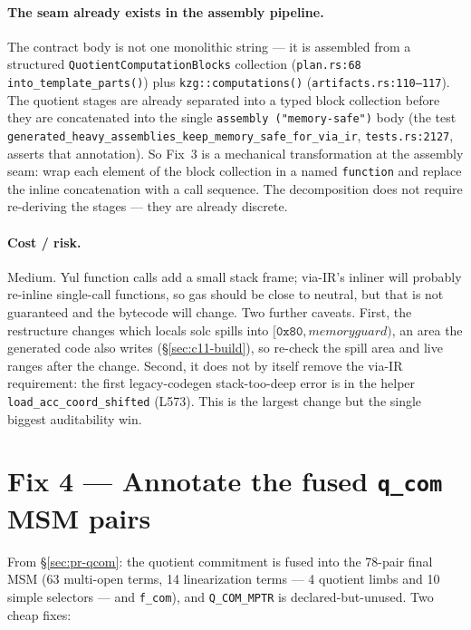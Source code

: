\paragraph{The seam already exists in the assembly pipeline.} The contract
body is not one monolithic string --- it is assembled from a structured
\texttt{QuotientComputationBlocks} collection
(\texttt{plan.rs:68} \texttt{into\_\allowbreak{}template\_\allowbreak{}parts()}) plus
\texttt{kzg::computations()} (\texttt{artifacts.rs:110--117}). The
quotient stages are already separated into a typed block collection before
they are concatenated into the single \texttt{assembly ("memory-safe")}
body (the test \texttt{generated\_\allowbreak{}heavy\_\allowbreak{}assemblies\_\allowbreak{}keep\_\allowbreak{}memory\_\allowbreak{}safe\_\allowbreak{}for\_\allowbreak{}via\_\allowbreak{}ir},
\texttt{tests.rs:2127}, asserts that annotation). So
Fix~3 is a mechanical transformation at the assembly seam: wrap each
element of the block collection in a named \texttt{function} and replace
the inline concatenation with a call sequence. The decomposition does not
require re-deriving the stages --- they are already discrete.

\paragraph{Cost / risk.} Medium. Yul function calls add a small stack
frame; via-IR's inliner will probably re-inline single-call functions, so gas
should be close to neutral, but that is not guaranteed and the bytecode will
change. Two further caveats. First, the restructure changes which locals
solc spills into $[\texttt{0x80},\textit{memoryguard})$, an area the
generated code also writes (\S\ref{sec:c11-build}), so re-check the spill
area and live ranges after the change. Second, it does not by itself remove
the via-IR requirement: the first legacy-codegen stack-too-deep error is in
the helper \texttt{load\_\allowbreak{}acc\_\allowbreak{}coord\_\allowbreak{}shifted} (L573). This is the
largest change but the single biggest auditability win.

\section{Fix 4 --- Annotate the fused \texttt{q\_com} MSM pairs}
\label{sec:read-qcom}

From \S\ref{sec:pr-qcom}: the quotient commitment is fused into the
78-pair final MSM (63 multi-open terms, 14 linearization terms --- 4 quotient
limbs and 10 simple selectors --- and \texttt{f\_com}), and
\texttt{Q\_COM\_MPTR} is declared-but-unused. Two cheap fixes:

